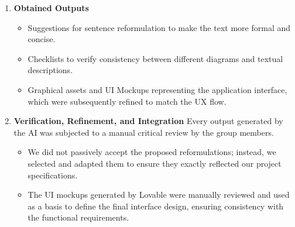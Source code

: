 \begin{enumerate}
\begin{itemize}
        \item \textbf{For UI Prototyping (via Lovable):} We provided detailed descriptions of the application screens, including layout structure, color palettes, and required UI elements, to generate high-fidelity visual mockups for Chapter 3.
        \begin{quote}
            \textbf{Example C - For UI Generation:} \textit{"Create a mobile screen for a cycling app in a modern style. It must include a map view showing a route, a bottom sheet showing real-time speed (25 km/h) and distance (12.4 km), and a large red circular button to 'Report Hazard'."}
        \end{quote}
    \end{itemize}

    \item \textbf{Obtained Outputs}
    \begin{itemize}
        \item Suggestions for sentence reformulation to make the text more formal and concise.
        \item Checklists to verify consistency between different diagrams and textual descriptions.
        \item Graphical assets and UI Mockups representing the application interface, which were subsequently refined to match the UX flow.
    \end{itemize}

    \item \textbf{Verification, Refinement, and Integration} Every output generated by the AI was subjected to a manual critical review by the group members.
    \begin{itemize}
        \item We did not passively accept the proposed reformulations; instead, we selected and adapted them to ensure they exactly reflected our project specifications.
        \item The UI mockups generated by Lovable were manually reviewed and used as a basis to define the final interface design, ensuring consistency with the functional requirements.
    \end{itemize}
\end{enumerate}

